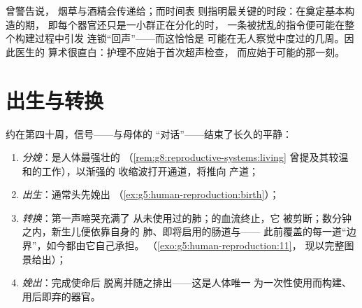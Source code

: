 \begin{example}[为何孕早期最需谨慎]\label{ex:g8:from-egg-to-birth:earlycare}
曾警告说，
烟草与酒精会传递给；而时间表
则指明最关键的时段：在奠定基本构造的期，
即每个器官还只是一小群正在分化的时，
一条被扰乱的指令便可能在整个构建过程中引发
连锁“回声”——而这恰恰是
可能在无人察觉中度过的几周。因此医生的
算术很直白：护理不应始于首次超声检查，
而应始于可能的那一刻。
\end{example}

\section{出生与转换}

\begin{proposition}[出生：由激素调控的转换]\label{prop:g8:from-egg-to-birth:birth}
约在第四十周，信号——与母体的
“对话”——结束了长久的平静：
\begin{enumerate}
  \item \emph{分娩}：是人体最强壮的
        （\cref{rem:g8:reproductive-systems:living}
        曾提及其较温和的工作），以渐强的
        收缩波打开通道，将推向
        产道；
  \item \emph{出生}：通常头先娩出
        （\cref{ex:g5:human-reproduction:birth}）；
  \item \emph{转换}：第一声啼哭充满了
        从未使用过的肺；的血流终止，它
        被剪断；数分钟之内，新生儿便依靠自身的
        肺、即将启用的肠道与——
        此前覆盖的每一道“边界”，如今都由它自己承担。
        （\cref{exo:g5:human-reproduction:11}，
        现以完整图景给出）；
  \item \emph{娩出}：完成使命后
        脱离并随之排出——这是人体唯一
        为一次性使用而构建、用后即弃的器官。
\end{enumerate}
\end{proposition}
\admitted


